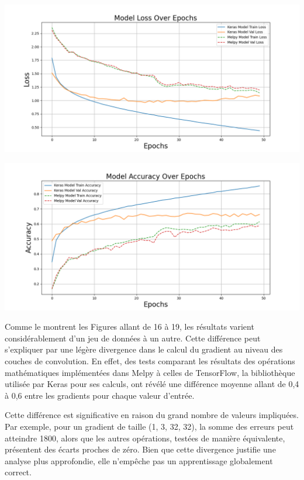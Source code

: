 \begin{multicols}{2}
\includegraphics[width=\columnwidth]{images/cifar10_loss_comparison.png}
\hfill\break

\includegraphics[width=\columnwidth]{images/cifar10_accuracy_comparison.png}
\hfill\break

Comme le montrent les Figures allant de 16 à 19, les résultats varient considérablement d’un jeu de données à un autre. 
Cette différence peut s’expliquer par une légère divergence dans le calcul du gradient au niveau des couches 
de convolution. En effet, des tests comparant les résultats des opérations mathématiques implémentées dans 
Melpy à celles de TensorFlow, la bibliothèque utilisée par Keras pour ses calculs, ont révélé une différence 
moyenne allant de 0,4 à 0,6 entre les gradients pour chaque valeur d’entrée. 

Cette différence est significative en raison du grand nombre de valeurs impliquées. 
Par exemple, pour un gradient de taille (1, 3, 32, 32), la somme des erreurs peut atteindre 1800, alors que 
les autres opérations, testées de manière équivalente, présentent des écarts proches de zéro. Bien que cette 
divergence justifie une analyse plus approfondie, elle n’empêche pas un apprentissage globalement correct. 


\end{multicols}
